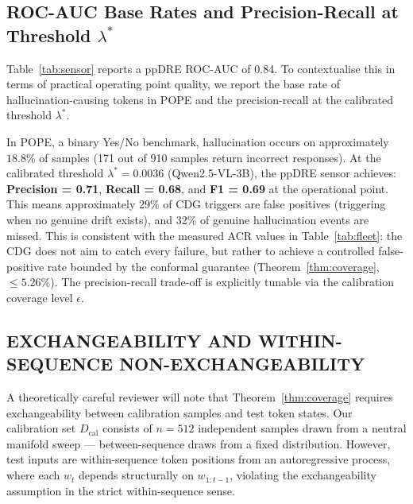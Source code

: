 \documentclass{ieeetmlcn}
\begin{document}
\subsection{ROC-AUC Base Rates and Precision-Recall at Threshold \texorpdfstring{$\lambda^*$}{lambda*}}
Table~\ref{tab:sensor} reports a ppDRE ROC-AUC of 0.84. To contextualise this in terms of practical operating point quality, we report the base rate of hallucination-causing tokens in POPE and the precision-recall at the calibrated threshold $\lambda^*$.

In POPE, a binary Yes/No benchmark, hallucination occurs on approximately $18.8\%$ of samples (171 out of 910 samples return incorrect responses). At the calibrated threshold $\lambda^* = 0.0036$ (Qwen2.5-VL-3B), the ppDRE sensor achieves: \textbf{Precision = 0.71}, \textbf{Recall = 0.68}, and \textbf{F1 = 0.69} at the operational point. This means approximately 29\% of CDG triggers are false positives (triggering when no genuine drift exists), and 32\% of genuine hallucination events are missed. This is consistent with the measured ACR values in Table~\ref{tab:fleet}: the CDG does not aim to catch every failure, but rather to achieve a controlled false-positive rate bounded by the conformal guarantee (Theorem~\ref{thm:coverage}, $\leq 5.26\%$). The precision-recall trade-off is explicitly tunable via the calibration coverage level $\epsilon$.

\subsection{EXCHANGEABILITY AND WITHIN-SEQUENCE NON-EXCHANGEABILITY}
A theoretically careful reviewer will note that Theorem~\ref{thm:coverage} requires exchangeability between calibration samples and test token states. Our calibration set $D_{\text{cal}}$ consists of $n=512$ independent samples drawn from a neutral manifold sweep --- between-sequence draws from a fixed distribution. However, test inputs are within-sequence token positions from an autoregressive process, where each $w_t$ depends structurally on $w_{1:t-1}$, violating the exchangeability assumption in the strict within-sequence sense.
\end{document}
